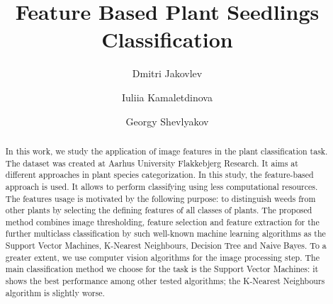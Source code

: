\documentclass[runningheads]{llncs}
\begin{document}
%
\title{Feature Based Plant Seedlings Classification}
%
\author{Dmitri Jakovlev \and Iuliia Kamaletdinova \and Georgy Shevlyakov}
%
%

%
\maketitle              %
%
\begin{abstract}
    In this work, we study the application of image features in the plant classification task. The dataset was created at Aarhus University Flakkebjerg Research. It aims at different approaches in plant species categorization. In this study, the feature-based approach is used. It allows to perform classifying using less computational resources. The features usage is motivated by the following purpose: to distinguish weeds from other plants by selecting the defining features of all classes of plants. The proposed method combines image thresholding, feature selection and feature extraction for the further multiclass classification by such well-known machine learning algorithms as the Support Vector Machines, K-Nearest Neighbours, Decision Tree and Naive Bayes. To a greater extent, we use computer vision algorithms for the image processing step. The main classification method we choose for the task is the Support Vector Machines: it shows the best performance among other tested algorithms; the K-Nearest Neighbours algorithm is slightly worse.

\end{abstract}
%
%
%









%
%



\end{document}
